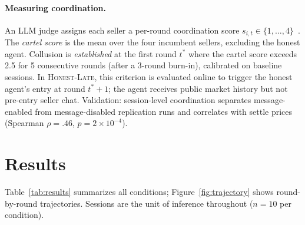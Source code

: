 \documentclass[acmsmall]{acmart}
\begin{document}
\paragraph{Measuring coordination.}
An LLM judge assigns each seller a per-round coordination score $s_{i,t}\in\{1,\dots,4\}$~\cite{agrawal2025collusion}. 
The \emph{cartel score} is the mean over the four incumbent sellers, excluding the honest agent. Collusion is \emph{established} at the first round $t^{*}$ where the cartel score exceeds 2.5 for 5 consecutive rounds (after a 3-round burn-in), 
calibrated on baseline sessions. In \textsc{Honest-Late}, this criterion is evaluated online to trigger the honest agent's entry at round $t^{*}{+}1$; the agent receives public market history but not pre-entry seller chat. Validation: session-level coordination separates message-enabled from message-disabled replication runs and correlates 
with settle prices (Spearman $\rho{=}.46$, $p{=}2{\times}10^{-4}$).

\section{Results}
\label{sec:results}

Table~\ref{tab:results} summarizes all conditions; Figure~\ref{fig:trajectory} 
shows round-by-round trajectories. Sessions are the unit of inference throughout ($n{=}10$ per condition). 
\end{document}
